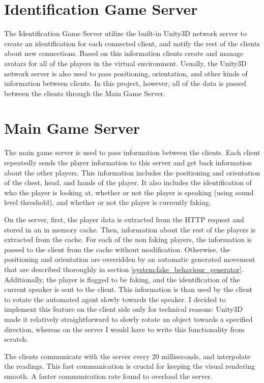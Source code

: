 \documentclass[]{simple-thesis}
\begin{document}
\section{Identification Game Server}

The Identification Game Server utilize the built-in Unity3D network server to create an identification for each connected client, and notify the rest of the clients about new connections.
Based on this information clients create and manage avatars for all of the players in the virtual environment.
Usually, the Unity3D network server is also used to pass positioning, orientation, and other kinds of information between clients.
In this project, however, all of the data is passed between the clients through the Main Game Server.

\section{Main Game Server}

The main game server is used to pass information between the clients.
Each client repeatedly sends the player information to this server and get back information about the other players.
This information includes the positioning and orientation of the chest, head, and hands of the player.
It also includes the identification of who the player is looking at, whether or not the player is speaking (using sound level threshold), and whether or not the player is currently faking.

On the server, first, the player data is extracted from the HTTP request and stored in an in memory cache.
Then, information about the rest of the players is extracted from the cache.
For each of the non faking players, the information is passed to the client from the cache without modification.
Otherwise, the positioning and orientation are overridden by an automatic generated movement that are described thoroughly in section \ref{system:fake_behaviour_generator}.
Additionally, the player is flagged to be faking, and the identification of the current speaker is sent to the client.
This information is than used by the client to rotate the automated agent slowly towards the speaker.
I decided to implement this feature on the client side only for technical reasons:
Unity3D made it relatively straightforward to slowly rotate an object towards a specified direction, whereas on the server I would have to write this functionality from scratch.

The clients communicate with the server every 20 milliseconds, and interpolate the readings.
This fast communication is crucial for keeping the visual rendering smooth.
A faster communication rate found to overload the server.
\end{document}
